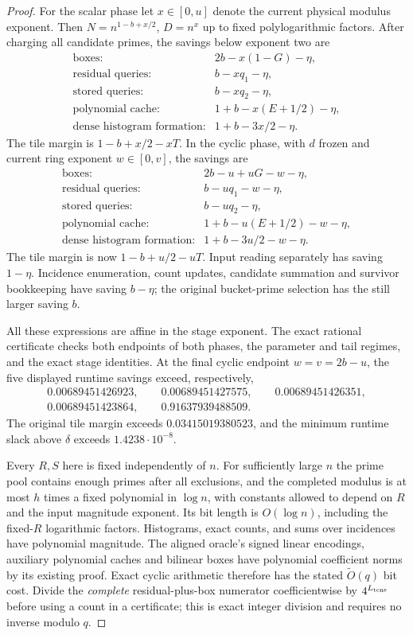 \documentclass[11pt]{article}
\newcommand{\softO}{\widetilde O}
\begin{document}
\begin{proof}
For the scalar phase let $x\in[0,u]$ denote the current physical
modulus exponent.  Then $N=n^{1-b+x/2}$, $D=n^x$ up to fixed
polylogarithmic factors.  After charging all candidate primes, the
savings below exponent two are
\[
\begin{array}{ll}
 \text{boxes:}&2b-x(1-G)-\eta,\\
 \text{residual queries:}&b-xq_1-\eta,\\
 \text{stored queries:}&b-xq_2-\eta,\\
 \text{polynomial cache:}&1+b-x(E+1/2)-\eta,\\
 \text{dense histogram formation:}&1+b-3x/2-\eta.
\end{array}
\]
The tile margin is $1-b+x/2-xT$.  In the cyclic phase, with
$d$ frozen and current ring exponent $w\in[0,v]$, the savings are
\[
\begin{array}{ll}
 \text{boxes:}&2b-u+uG-w-\eta,\\
 \text{residual queries:}&b-uq_1-w-\eta,\\
 \text{stored queries:}&b-uq_2-\eta,\\
 \text{polynomial cache:}&1+b-u(E+1/2)-w-\eta,\\
 \text{dense histogram formation:}&1+b-3u/2-w-\eta.
\end{array}
\]
The tile margin is now $1-b+u/2-uT$.  Input reading separately
has saving $1-\eta$.  Incidence enumeration, count updates, candidate
summation and survivor bookkeeping have saving $b-\eta$; the original
bucket-prime selection has the still larger saving $b$.

All these expressions are affine in the stage exponent.  The exact
rational certificate checks both endpoints of both phases, the
parameter and tail regimes, and the exact stage identities.  At the
final cyclic endpoint $w=v=2b-u$, the five displayed runtime savings
exceed, respectively,
\[
\begin{gathered}
 0.00689451426923,\qquad 0.00689451427575,\qquad
 0.00689451426351,\\ 0.00689451423864,\qquad
 0.91637939488509.
\end{gathered}
\]
The original tile margin exceeds $0.03415019380523$, and the minimum
runtime slack above $\delta$ exceeds $1.4238\cdot10^{-8}$.

Every $R,S$ here is fixed independently of $n$.  For sufficiently
large $n$ the prime pool contains enough primes after all exclusions,
and the completed modulus is at most $h$ times a fixed polynomial in
$\log n$, with constants allowed to depend on $R$ and the input
magnitude exponent.  Its bit length is $O(\log n)$, including the
fixed-$R$ logarithmic factors.  Histograms, exact counts, and sums over
incidences have polynomial magnitude.  The aligned oracle's signed
linear encodings, auxiliary polynomial caches and bilinear boxes have
polynomial coefficient norms by its existing proof.  Exact cyclic
arithmetic therefore has the stated $\softO(q)$ bit cost.  Divide the
\emph{complete} residual-plus-box numerator coefficientwise by
$4^{L_{\rm tens}}$ before using a count in a certificate; this is exact
integer division and requires no inverse modulo $q$.


\end{proof}
\end{document}
